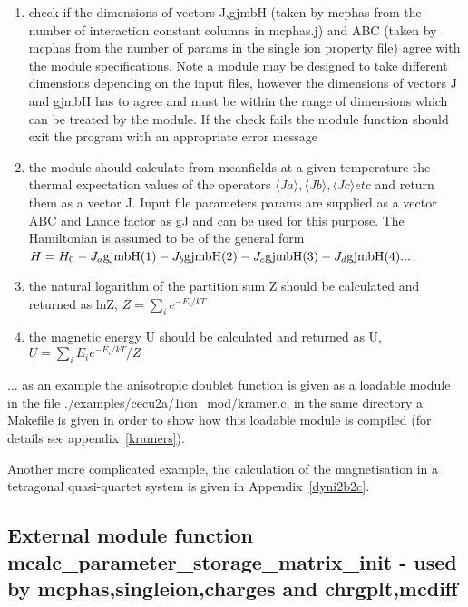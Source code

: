 \begin{enumerate}
\item check if the dimensions of vectors J,gjmbH (taken by {\prg mcphas} from the number of 
interaction constant columns in {\prg mcphas.j})
 and ABC (taken by {\prg mcphas} from the number of params in the single ion property
file) agree with the module specifications. Note a module may be designed to 
take different dimensions depending on the input files, however the dimensions
of vectors J and gjmbH has to agree and must be within the range of dimensions which
can be treated by the module. If the check fails the module function should exit the
program with an appropriate error message
\item the module should calculate from meanfields at a given temperature the 
thermal expectation values of the operators $\langle Ja\rangle, \langle Jb\rangle,\langle Jc\rangle etc$ and return them as
a vector J. Input file parameters params are supplied as a vector ABC and
Lande factor as gJ and  can be used for this purpose. The Hamiltonian
is assumed to be of the general form $H=H_0-J_a {\rm gjmbH}(1) -J_b {\rm gjmbH}(2) -J_c {\rm gjmbH}(3) -J_d {\rm %
gjmbH}(4) ...$.
\item the natural logarithm of the partition sum Z should be calculated and returned as lnZ,
$Z=\sum_i e^{-E_i/kT}$
\item the magnetic energy U should be calculated and returned as U, $U=\sum_i E_i e^{-E_i/kT}/Z$
\end{enumerate}

... as an example the anisotropic doublet function is given as a
loadable module in the file {\prg ./examples/cecu2a/1ion\_mod/kramer.c}, in the same
directory a Makefile is given in order to show how this loadable
module is compiled (for details see appendix~\ref{kramers}).

Another more complicated example, the calculation of the magnetisation
in a tetragonal quasi-quartet system is given in Appendix~\ref{dyni2b2c}.

\subsection{External module function {\prg mcalc\_parameter\_storage\_matrix\_init} - used by {\prg %
mcphas},{\prg singleion},{\prg charges} and {\prg %
chrgplt},{\prg mcdiff}  }

